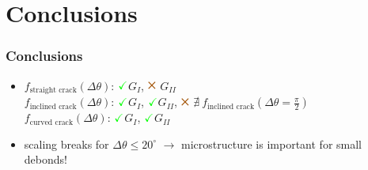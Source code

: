 \documentclass[first,firstsupp,lastsupp,last,hyperref,table]{ETHclass}
\newcommand{\Cross}{$\mathbin{\tikz [x=1.4ex,y=1.4ex,line width=.2ex, red] \draw (0,0) -- (1,1) (0,1) -- (1,0);}$}%
\newcommand{\Checkmark}{$\color{green}\mathbf{\checkmark}$}
\begin{document}
\begin{frame}
\begin{columns}[c]
\begin{column}{0.5\textwidth}
\begin{figure}
\end{figure}
\end{column}
\end{columns}
\end{frame}

\section{Conclusions}

\begin{frame}
\frametitle{Conclusions}
\vspace{-0.5cm}
\centering
\begin{itemize}[label=]
\item $f_{\text{straight crack}}\left(\Delta\theta\right)$: \Checkmark $G_{I}$, \textcolor{red}{\Cross} $G_{II}$\\[10pt]
$f_{\text{inclined crack}}\left(\Delta\theta\right)$: \Checkmark $G_{I}$, \Checkmark $G_{II}$, \textcolor{red}{\Cross} $\nexists\ f_{\text{inclined crack}}\left(\Delta\theta=\frac{\pi}{2}\right)$\\[10pt]
$f_{\text{curved crack}}\left(\Delta\theta\right)$: \Checkmark $G_{I}$, \Checkmark $G_{II}$\\[20pt]
\item scaling breaks for $\Delta\theta\leq20^{\circ}$ $\rightarrow$ microstructure is important for small debonds!
\end{itemize}
\end{frame}

\begin{frame}[plain]
\frametitle{}
\end{frame}
\end{document}
